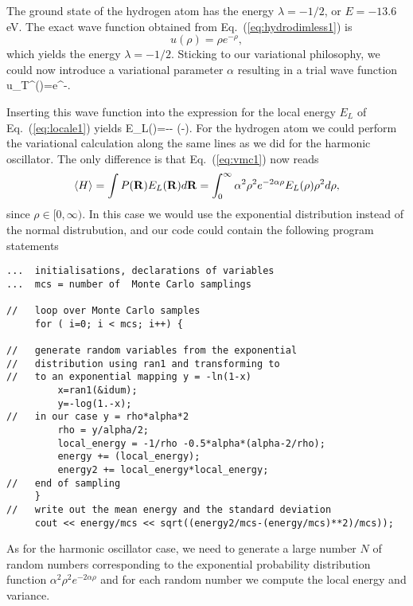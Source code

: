 The ground state of the hydrogen atom has the energy
$\lambda=-1/2$, or $E=-13.6$ eV. The exact wave function 
obtained from Eq.~(\ref{eq:hydrodimless1}) is
\[
   u(\rho)=\rho e^{-\rho},
\]
which yields the energy $\lambda = -1/2$. 
Sticking to our variational philosophy, we could now introduce 
a variational parameter $\alpha$ resulting in a trial
wave function 
\be
   u_T^{\alpha}(\rho)=\alpha\rho e^{-\alpha\rho}. 
   \label{eq:trialhydrogen}
\ee

Inserting this wave function into the expression for the
local energy $E_L$ of Eq.~(\ref{eq:locale1}) yields
\be
   E_L(\rho)=--
              \left(\alpha-\right).
      \label{eq:localhydrogen}
\ee
For the hydrogen atom we could perform the variational calculation 
along the same lines as we did for the harmonic oscillator.
The only difference is that Eq.~(\ref{eq:vmc1}) now reads
\[
  \langle H \rangle =\int P({\bf R})E_L({\bf R}) d{\bf R}=
  \int_0^{\infty}\alpha^2\rho^2 e^{-2\alpha\rho}E_L(\rho)\rho^2d\rho,
\]
since $\rho\in [0, \infty )$. In this case we would use the exponential
distribution instead of the normal distrubution, and our code could contain
the following program statements
\begin{lstlisting}
...  initialisations, declarations of variables
...  mcs = number of  Monte Carlo samplings
     
//   loop over Monte Carlo samples
     for ( i=0; i < mcs; i++) {

//   generate random variables from the exponential 
//   distribution using ran1 and transforming to
//   to an exponential mapping y = -ln(1-x)
         x=ran1(&idum);
         y=-log(1.-x);
//   in our case y = rho*alpha*2
         rho = y/alpha/2;
         local_energy = -1/rho -0.5*alpha*(alpha-2/rho);
         energy += (local_energy);
         energy2 += local_energy*local_energy;
//   end of sampling
     }
//   write out the mean energy and the standard deviation
     cout << energy/mcs << sqrt((energy2/mcs-(energy/mcs)**2)/mcs));
\end{lstlisting}
As for the harmonic oscillator case, we need to generate a large
number $N$ of random numbers corresponding to the exponential probability distribution function
$\alpha^2\rho^2 e^{-2\alpha\rho}$ and for each random number we compute the 
local energy and variance.
